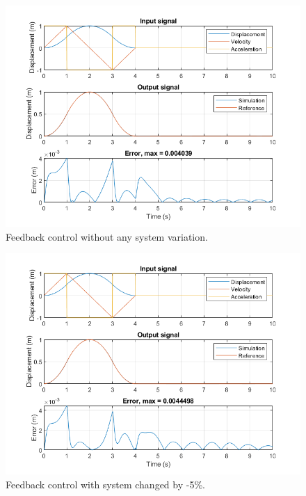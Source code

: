 \documentclass[12pt]{article}
\begin{document}
\begin{enumerate}[(a)]
    \begin{figure}[h]
      \includegraphics{no_error_fb.png}
      \centering
      \caption{Feedback control without any system variation.}
    \end{figure}

    \begin{figure}[h]
      \includegraphics{n5_error_fb.png}
      \centering
      \caption{Feedback control with system changed by -5\%.}
    \end{figure}


\end{enumerate}
\end{document}
